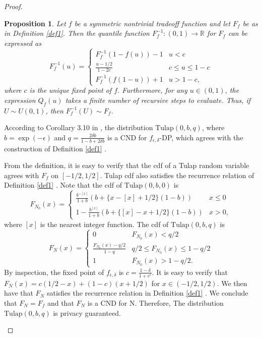 \documentclass{article}
\newtheorem{prop}{Proposition}
\begin{document}
\begin{proof}
\begin{enumerate}
\begin{prop}\label{prop1}   %
    Let $f$ be a symmetric nontrivial tradeoff function and let $F_f$ be as in Definition \ref{def1}. 
    Then the quantile function $F_f^{-1}:(0,1)\rightarrow \mathbb{R}$ for $F_f$ can be expressed as
    \[F_f^{-1}(u) = \begin{cases}
    F_f^{-1}(1-f(u))-1&u<c\\
    \frac{u-1/2}{1-2c}&c\leq u\leq 1-c\\
    F_f^{-1}(f(1-u))+1&u>1-c,
    \end{cases}\]
    where $c$ is the unique fixed point of $f$. 
    {Furthermore, for any $u\in (0,1)$, the expression $Q_f(u)$ takes a finite number of recursive steps to evaluate. Thus,} 
    if $U\sim U(0,1)$, then $F_f^{-1}(U) \sim F_f$. 
\end{prop}

According to Corollary 3.10 in \cite{awan2023canonical}, 
the distribution $\mathrm{Tulap}(0,b,q)$, where $b=\exp(-\epsilon)$ and $q = \frac{2\delta b}{1-b+2\delta b}$ 
is a CND for $f_{\epsilon,\delta}$-DP, which agrees with the construction of Definition \ref{def1} \parencite{awan2023canonical}. 

From the definition, it is easy to verify that the cdf of a Tulap random variable agrees with $F_f$ on $[-1/2,1/2]$. 
Tulap cdf also satisfies the recurrence relation of Definition \ref{def1} \parencite{awan2023canonical}. 
Note that the cdf of $\mathrm{Tulap}(0,b,0)$ is 
\[F_{N_0}(x) = \begin{cases}
    \frac{b^{-[x]}}{1+b}(b+\{x-[x]+1/2\}(1-b))& x\leq 0\\
    1- \frac{b^{[x]}}{1+b}(b+\{[x]-x+1/2\}(1-b))&x>0,
\end{cases}\]
where $[x]$ is the nearest integer function. 
The cdf of $\mathrm{Tulap}(0,b,q)$ is
\[F_N(x) = \begin{cases}
    0&F_{N_0}(x)<q/2\\
    \frac{F_{N_0}(x)-q/2}{1-q}& q/2\leq F_{N_0}(x)\leq 1-q/2\\
    1&F_{N_0}(x)>1-q/2.
\end{cases}\]
By inspection, the fixed point of $f_{\epsilon,\delta}$ is $c=\frac{1-\delta}{1+e^\epsilon}$. 
It is easy to verify that $F_N(x) = c(1/2-x) + (1-c)(x+1/2)$ for $x\in (-1/2,1/2)$. 
We then have that $F_N$ satisfies the recurrence relation in Definition \ref{def1} \parencite{awan2023canonical}. 
We conclude that $F_N = F_f$ and that $F_N$ is a CND for N. Therefore, The distribution $\mathrm{Tulap}(0,b,q)$ is privacy guaranteed.
\end{enumerate}
\end{proof}

\printbibliography
\end{document}
